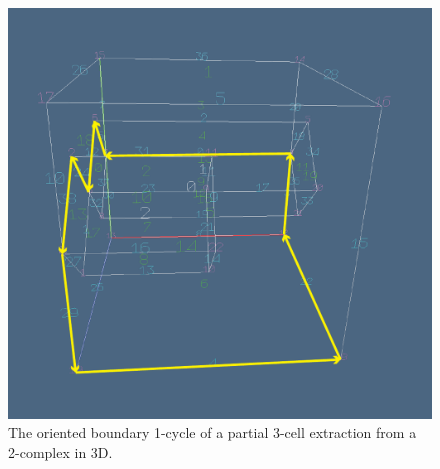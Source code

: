 \documentclass[11pt,oneside]{article}	%
\begin{document}
\begin{figure}[htbp] %
   \centering
   \includegraphics[width=0.5\linewidth]{images/edgecycle} 
   \caption{The oriented boundary 1-cycle of a partial 3-cell extraction from a 2-complex in 3D.}
   \label{fig:edgecycle}
\end{figure}




\end{document}
